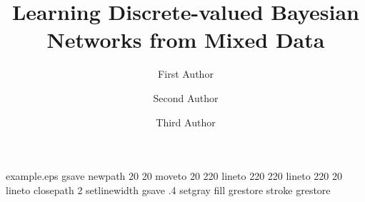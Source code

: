 %
%
%
%
%
\begin{filecontents*}{example.eps}
gsave
newpath
  20 20 moveto
  20 220 lineto
  220 220 lineto
  220 20 lineto
closepath
2 setlinewidth
gsave
  .4 setgray fill
grestore
stroke
grestore
\end{filecontents*}
%
\RequirePackage{fix-cm}
%
\documentclass[smallextended]{svjour3}       %
%
\smartqed  %
%
\usepackage{amsmath}
\usepackage{bm}
\usepackage{graphicx} %
\usepackage{epstopdf}
\usepackage{algorithm}
\usepackage[noend]{algpseudocode}
\usepackage[round]{natbib}
%
%
%
%
%


\title{Learning Discrete-valued Bayesian Networks from Mixed Data%
}


\author{First Author         \and
        Second Author         \and
        Third Author%
}

